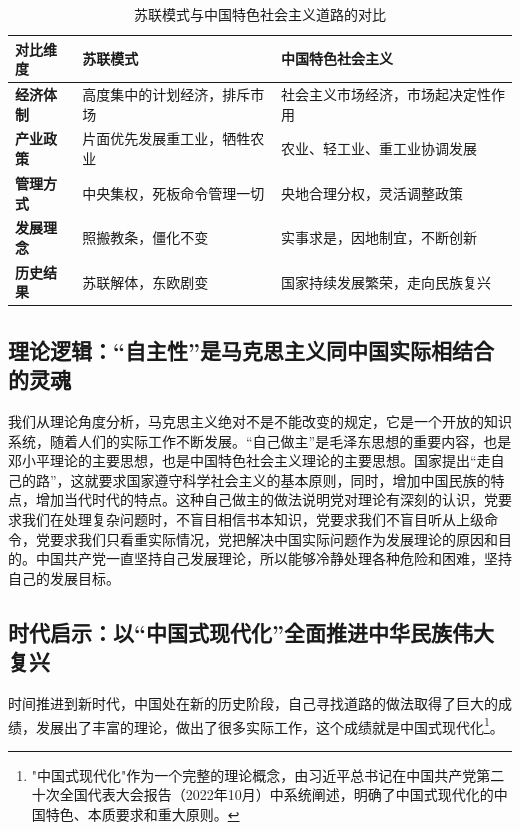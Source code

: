\documentclass[12pt, a4paper]{ctexart}
\numberwithin{table}{section}
\numberwithin{figure}{section}
\begin{document}
\vspace{0.5em}
\begin{table}[htbp]
\centering
\caption{苏联模式与中国特色社会主义道路的对比}
\begin{tabularx}{0.92\textwidth}{>{\bfseries\centering\arraybackslash}p{2cm} X X}
\toprule
\textbf{对比维度} & \textbf{苏联模式} & \textbf{中国特色社会主义} \\
\midrule
经济体制 & 高度集中的计划经济，排斥市场 & 社会主义市场经济，市场起决定性作用 \\
\addlinespace
产业政策 & 片面优先发展重工业，牺牲农业 & 农业、轻工业、重工业协调发展 \\
\addlinespace
管理方式 & 中央集权，死板命令管理一切 & 央地合理分权，灵活调整政策 \\
\addlinespace
发展理念 & 照搬教条，僵化不变 & 实事求是，因地制宜，不断创新 \\
\addlinespace
历史结果 & 苏联解体，东欧剧变 & 国家持续发展繁荣，走向民族复兴 \\
\bottomrule
\end{tabularx}
\end{table}

\subsection{理论逻辑：“自主性”是马克思主义同中国实际相结合的灵魂}
我们从理论角度分析，马克思主义绝对不是不能改变的规定，它是一个开放的知识系统，随着人们的实际工作不断发展。“自己做主”是毛泽东思想的重要内容，也是邓小平理论的主要思想，也是中国特色社会主义理论的主要思想。国家提出“走自己的路”，这就要求国家遵守科学社会主义的基本原则，同时，增加中国民族的特点，增加当代时代的特点。这种自己做主的做法说明党对理论有深刻的认识，党要求我们在处理复杂问题时，不盲目相信书本知识，党要求我们不盲目听从上级命令，党要求我们只看重实际情况，党把解决中国实际问题作为发展理论的原因和目的。中国共产党一直坚持自己发展理论，所以能够冷静处理各种危险和困难，坚持自己的发展目标。

\subsection{时代启示：以“中国式现代化”全面推进中华民族伟大复兴}
时间推进到新时代，中国处在新的历史阶段，自己寻找道路的做法取得了巨大的成绩，发展出了丰富的理论，做出了很多实际工作，这个成绩就是中国式现代化\footnote{"中国式现代化"作为一个完整的理论概念，由习近平总书记在中国共产党第二十次全国代表大会报告（2022年10月）中系统阐述，明确了中国式现代化的中国特色、本质要求和重大原则。}。
\end{document}
